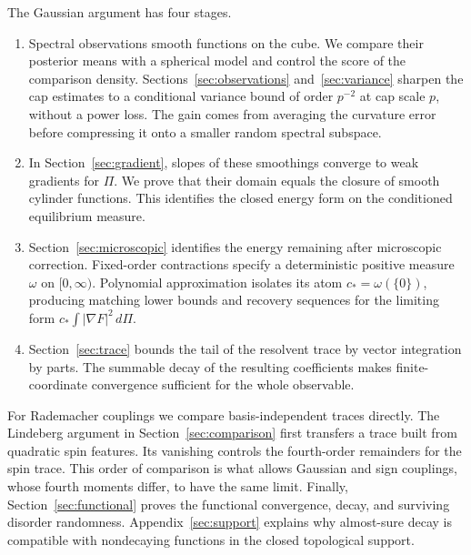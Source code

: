 The Gaussian argument has four stages.
\begin{enumerate}
\item Spectral observations smooth functions on the cube. We compare their
posterior means with a spherical model and control the score of the
comparison density. Sections~\ref{sec:observations} and~\ref{sec:variance}
sharpen the cap estimates to a conditional variance bound of order $p^{-2}$
at cap scale $p$, without a power loss. The gain comes from averaging the
curvature error before compressing it onto a smaller random spectral subspace.
\item In Section~\ref{sec:gradient}, slopes of these smoothings converge to
weak gradients for $\Pi$. We prove that their domain equals the closure of
smooth cylinder functions. This identifies the closed energy form on the
conditioned equilibrium measure.
\item Section~\ref{sec:microscopic} identifies the energy remaining after
microscopic correction. Fixed-order contractions specify a deterministic
positive measure $\omega$ on $[0,\infty)$. Polynomial approximation isolates
its atom $c_*=\omega(\{0\})$, producing matching lower bounds and recovery
sequences for the limiting form $c_*\int|\nabla F|^2\,d\Pi$.
\item Section~\ref{sec:trace} bounds the tail of the resolvent trace by vector
integration by parts. The summable decay of the resulting coefficients makes
finite-coordinate convergence sufficient for the whole observable.
\end{enumerate}

For Rademacher couplings we compare basis-independent traces directly.
The Lindeberg argument in Section~\ref{sec:comparison} first transfers a
trace built from quadratic spin features. Its vanishing controls the
fourth-order remainders for the spin trace. This order of comparison is what
allows Gaussian and sign couplings, whose fourth moments differ, to have
the same limit. Finally, Section~\ref{sec:functional} proves the functional
convergence, decay, and surviving disorder randomness. Appendix~\ref{sec:support}
explains why almost-sure decay is compatible with nondecaying functions in
the closed topological support.
